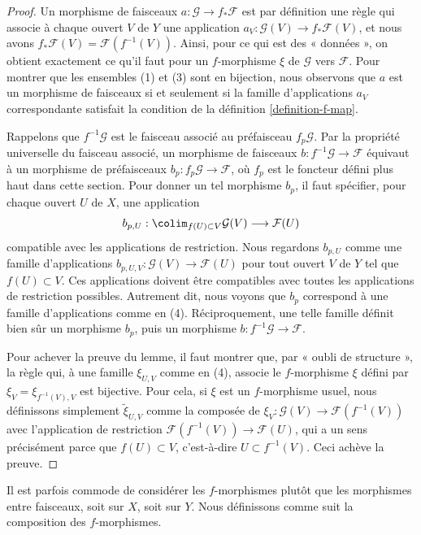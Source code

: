 \begin{proof}
Un morphisme de faisceaux $a : \mathcal{G} \to f_*\mathcal{F}$
est par définition une règle qui associe à chaque ouvert $V$ de $Y$
une application $a_V : \mathcal{G}(V) \to f_*\mathcal{F}(V)$,
et nous avons $f_*\mathcal{F}(V) = \mathcal{F}(f^{-1}(V))$.
Ainsi, pour ce qui est des « données », on obtient exactement ce qu'il faut
pour un $f$-morphisme $\xi$ de $\mathcal{G}$ vers $\mathcal{F}$.
Pour montrer que les ensembles (1) et (3) sont en bijection, nous observons que
$a$ est un morphisme de faisceaux si et seulement si la famille d'applications $a_V$
correspondante satisfait la condition de la définition \ref{definition-f-map}.

\medskip\noindent
Rappelons que $f^{-1}\mathcal{G}$ est le faisceau associé au préfaisceau $f_p\mathcal{G}$.
Par la propriété universelle du faisceau associé, un morphisme de faisceaux
$b : f^{-1}\mathcal{G} \to \mathcal{F}$ équivaut à un morphisme de
préfaisceaux $b_p : f_p\mathcal{G} \to \mathcal{F}$, où $f_p$ est le
foncteur défini plus haut dans cette section. Pour donner un tel morphisme $b_p$,
il faut spécifier, pour chaque ouvert $U$ de $X$, une application
$$
b_{p, U} :
\colim_{f(U) \subset V} \mathcal{G}(V)
\longrightarrow
\mathcal{F}(U)
$$
compatible avec les applications de restriction. Nous regardons $b_{p, U}$
comme une famille d'applications $b_{p, U, V} : \mathcal{G}(V) \to \mathcal{F}(U)$
pour tout ouvert $V$ de $Y$ tel que $f(U) \subset V$. Ces applications doivent être
compatibles avec toutes les applications de restriction possibles.
Autrement dit, nous voyons que $b_p$ correspond à une famille d'applications
comme en (4). Réciproquement, une telle famille définit bien sûr un morphisme
$b_p$, puis un morphisme $b : f^{-1}\mathcal{G} \to \mathcal{F}$.

\medskip\noindent
Pour achever la preuve du lemme, il faut montrer que, par
« oubli de structure », la règle qui, à une famille $\xi_{U, V}$
comme en (4), associe le $f$-morphisme $\xi$ défini par $\xi_V = \xi_{f^{-1}(V), V}$
est bijective. Pour cela, si $\xi$ est un $f$-morphisme usuel, nous
définissons simplement $\tilde \xi_{U, V}$ comme la composée de
$\xi_V : \mathcal{G}(V) \to \mathcal{F}(f^{-1}(V))$
avec l'application de restriction $\mathcal{F}(f^{-1}(V)) \to \mathcal{F}(U)$,
qui a un sens précisément parce que $f(U) \subset V$, c'est-à-dire
$U \subset f^{-1}(V)$. Ceci achève la preuve.
\end{proof}

\noindent
Il est parfois commode de considérer les $f$-morphismes
plutôt que les morphismes entre faisceaux, soit sur $X$, soit sur $Y$.
Nous définissons comme suit la composition des $f$-morphismes.

